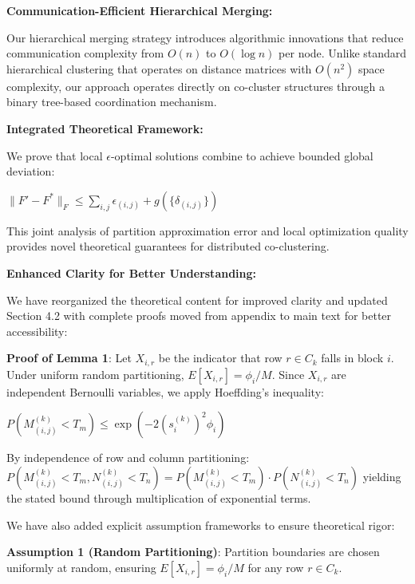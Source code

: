 \documentclass{ar2rc}
\begin{document}
\textbf{Communication-Efficient Hierarchical Merging:}

Our hierarchical merging strategy introduces algorithmic innovations that reduce communication complexity from $O(n)$ to $O(\log n)$ per node. Unlike standard hierarchical clustering that operates on distance matrices with $O(n^2)$ space complexity, our approach operates directly on co-cluster structures through a binary tree-based coordination mechanism.

\textbf{Integrated Theoretical Framework:}

We prove that local $\epsilon$-optimal solutions combine to achieve bounded global deviation:

$\|F' - F^*\|_F \leq \sum_{i,j} \epsilon_{(i,j)} + g(\{\delta_{(i,j)}\})$

This joint analysis of partition approximation error and local optimization quality provides novel theoretical guarantees for distributed co-clustering.



\textbf{Enhanced Clarity for Better Understanding:}

We have reorganized the theoretical content for improved clarity and updated Section 4.2 with complete proofs moved from appendix to main text for better accessibility:

\textbf{Proof of Lemma 1}: Let $X_{i,r}$ be the indicator that row $r \in C_k$ falls in block $i$. Under uniform random partitioning, $E[X_{i,r}] = \phi_i/M$. Since $X_{i,r}$ are independent Bernoulli variables, we apply Hoeffding's inequality:

$P(M_{(i,j)}^{(k)} < T_m) \leq \exp\left(-2(s_i^{(k)})^2 \phi_i\right)$

By independence of row and column partitioning:
$P(M_{(i,j)}^{(k)} < T_m, N_{(i,j)}^{(k)} < T_n) = P(M_{(i,j)}^{(k)} < T_m) \cdot P(N_{(i,j)}^{(k)} < T_n)$
yielding the stated bound through multiplication of exponential terms.

We have also added explicit assumption frameworks to ensure theoretical rigor:

\textbf{Assumption 1 (Random Partitioning)}: Partition boundaries are chosen uniformly at random, ensuring $E[X_{i,r}] = \phi_i/M$ for any row $r \in C_k$.
\end{document}

